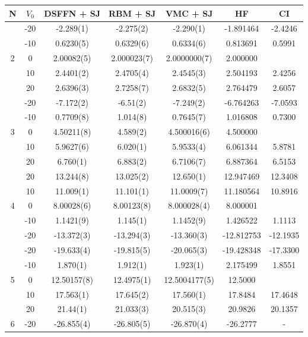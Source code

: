 \begin{table}[h]
\centering
\begin{tabular}{c|c|c|c|c|c|c}
\toprule
\textbf{N} & $V_0$& \textbf{DSFFN + SJ} & \textbf{RBM + SJ} & \textbf{VMC + SJ} & \textbf{HF} \cite{drissifermion} & \textbf{CI} \cite{drissifermion} \\
\midrule
\multirow{5}{*}{2} & -20 & -2.289(1) & -2.275(2) & -2.290(1) & -1.891464 & -2.4246 \\
& -10 & 0.6230(5) & 0.6329(6) & 0.6334(6) & 0.813691 & 0.5991 \\
& 0 & 2.00082(5) & 2.000023(7) & 2.0000000(7) & 2.000000 &  \\
& 10 & 2.4401(2) & 2.4705(4) & 2.4545(3) & 2.504193 & 2.4256 \\
& 20 & 2.6396(3) & 2.7258(7) & 2.6832(5) & 2.764479 & 2.6057 \\
\midrule
\multirow{5}{*}{3} & -20 & -7.172(2) & -6.51(2) & -7.249(2) & -6.764263 & -7.0593 \\
& -10 & 0.7709(8) & 1.014(8) & 0.7645(7) & 1.016808 & 0.7300 \\
& 0 & 4.50211(8) & 4.589(2) & 4.500016(6) & 4.500000 &  \\
& 10 & 5.9627(6) & 6.020(1) & 5.9533(4) & 6.061344 & 5.8781 \\
& 20 & 6.760(1) & 6.883(2) & 6.7106(7) & 6.887364 & 6.5153 \\
\midrule
\multirow{5}{*}{4} & 20 & 13.244(8) & 13.025(2) & 12.650(1) & 12.947469 & 12.3408 \\
& 10 & 11.009(1) & 11.101(1) & 11.0009(7) & 11.180564 & 10.8916 \\
& 0 & 8.00028(6) & 8.00123(8) & 8.000028(4) & 8.000001 &  \\
& -10 & 1.1421(9) & 1.145(1) & 1.1452(9) & 1.426522 & 1.1113 \\
& -20 & -13.372(3) & -13.294(3) & -13.360(3) & -12.812753 & -12.1935 \\
\midrule
\multirow{5}{*}{5} & -20 & -19.633(4) & -19.815(5) & -20.065(3) & -19.428348 & -17.3300 \\
& -10 & 1.870(1) & 1.912(1) & 1.923(1) & 2.175499 & 1.8551 \\
& 0 & 12.50157(8) & 12.4975(1) & 12.5004177(5) & 12.5000 &  \\
& 10 & 17.563(1) & 17.645(2) & 17.560(1) & 17.8484 & 17.4648 \\
& 20 & 21.44(1) & 21.033(3) & 20.515(3) & 20.9826 & 20.1357 \\
\midrule
\multirow{5}{*}{6} & -20 & -26.855(4) & -26.805(5) & -26.870(4) & -26.2777 & - \\

\end{tabular}
\end{table}
